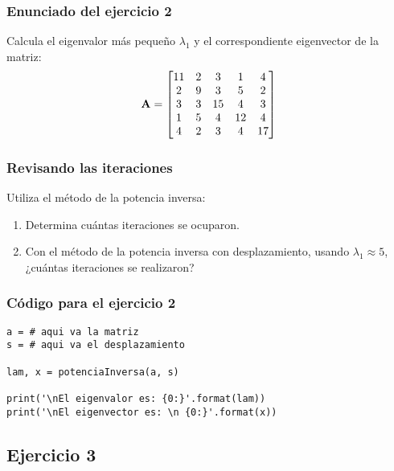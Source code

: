 \documentclass[12pt]{beamer}
\begin{document}
\begin{frame}
\frametitle{Enunciado del ejercicio 2}
Calcula el eigenvalor más pequeño $\lambda_{1}$ y el correspondiente eigenvector de la matriz:
\pause
\renewcommand{\arraystretch}{1}
\begin{align*}
\vb{A} = 
\begin{bmatrix}
11 & 2 & 3 & 1 & 4 \\
2 & 9 & 3 & 5 & 2 \\
3 & 3 & 15 & 4 & 3 \\
1 & 5 & 4 & 12 & 4 \\
4 & 2 & 3 & 4 & 17 \\
\end{bmatrix}
\end{align*}
\end{frame}
\begin{frame}
\frametitle{Revisando las iteraciones}
Utiliza el método de la potencia inversa:
\pause
{}
\begin{enumerate}[<+->]
\item Determina cuántas iteraciones se ocuparon.
\item Con el método de la potencia inversa con desplazamiento, usando $\lambda_{1} \approx 5$, ¿cuántas iteraciones se realizaron? 
\end{enumerate}
\end{frame}
\begin{frame}[fragile]
\frametitle{Código para el ejercicio 2}
\begin{lstlisting}[caption=Ejercicio para el método de la potencia inversa con desplazamiento]
a = # aqui va la matriz
s = # aqui va el desplazamiento

lam, x = potenciaInversa(a, s)

print('\nEl eigenvalor es: {0:}'.format(lam))
print('\nEl eigenvector es: \n {0:}'.format(x))
\end{lstlisting}
\end{frame}

\subsection{Ejercicio 3}
\end{document}
